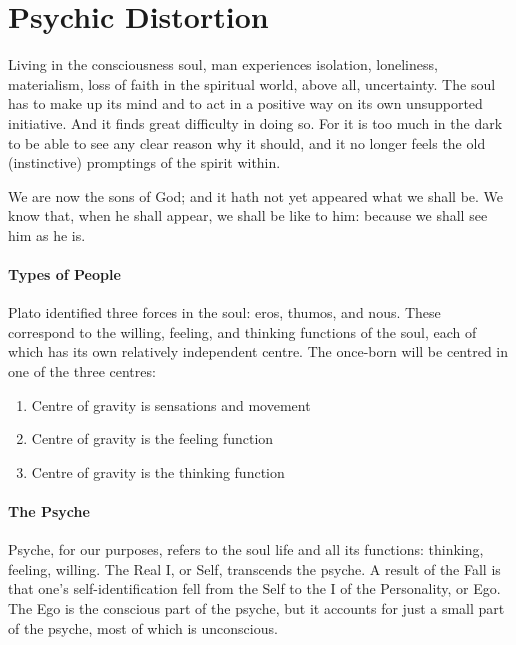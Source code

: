 \section{Psychic Distortion}

\begin{quotex}
Living in the consciousness soul, man experiences isolation, loneliness, materialism, loss of faith in the spiritual world, above all, uncertainty. The soul has to make up its mind and to act in a positive way on its own unsupported initiative. And it finds great difficulty in doing so. For it is too much in the dark to be able to see any clear reason why it should, and it no longer feels the old (instinctive) promptings of the spirit within. 

We are now the sons of God; and it hath not yet appeared what we shall be. We know that, when he shall appear, we shall be like to him: because we shall see him as he is. 

\end{quotex}
\paragraph{Types of People}
Plato identified three forces in the soul: eros, thumos, and nous. These correspond to the willing, feeling, and thinking functions of the soul, each of which has its own relatively independent centre. The once-born will be centred in one of the three centres:

\begin{enumerate}
\item Centre of gravity is sensations and movement 
\item Centre of gravity is the feeling function 
\item Centre of gravity is the thinking function 
\end{enumerate}
\paragraph{The Psyche}
Psyche, for our purposes, refers to the soul life and all its functions: thinking, feeling, willing. The Real I, or Self, transcends the psyche. A result of the Fall is that one's self-identification fell from the Self to the I of the Personality, or Ego. The Ego is the conscious part of the psyche, but it accounts for just a small part of the psyche, most of which is unconscious.

